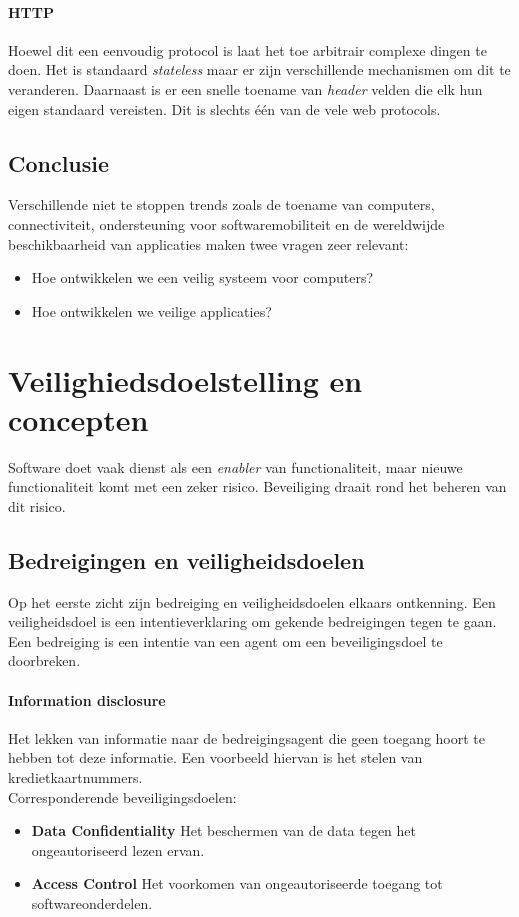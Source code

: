 \documentclass[../main.tex]{subfiles}
\begin{document}
\paragraph{HTTP} Hoewel dit een eenvoudig protocol is laat het toe arbitrair complexe dingen te doen. Het is standaard \textit{stateless} maar er zijn verschillende mechanismen om dit te veranderen. Daarnaast is er een snelle toename van \textit{header} velden die elk hun eigen standaard vereisten. Dit is slechts \'e\'en van de vele web protocols.

\subsection{Conclusie}
Verschillende niet te stoppen trends zoals de toename van computers, connectiviteit, ondersteuning voor softwaremobiliteit en de wereldwijde beschikbaarheid van applicaties maken twee vragen zeer relevant:
\begin{itemize}
	\item Hoe ontwikkelen we een veilig systeem voor computers?
	\item Hoe ontwikkelen we veilige applicaties?
\end{itemize}

\section{Veilighiedsdoelstelling en concepten}
Software doet vaak dienst als een \textit{enabler} van functionaliteit, maar nieuwe functionaliteit komt met een zeker risico. Beveiliging draait rond het beheren van dit risico.
\subsection{Bedreigingen en veiligheidsdoelen}
Op het eerste zicht zijn bedreiging en veiligheidsdoelen elkaars ontkenning. Een veiligheidsdoel is een intentieverklaring om gekende bedreigingen tegen te gaan. Een bedreiging is een intentie van een agent om een beveiligingsdoel te doorbreken.

\paragraph{Information disclosure} 
Het lekken van informatie naar de bedreigingsagent die geen toegang hoort te hebben tot deze informatie. Een voorbeeld hiervan is het stelen van kredietkaartnummers. 
\\
Corresponderende beveiligingsdoelen:
\begin{itemize}
	\item \textbf{Data Confidentiality} Het beschermen van de data tegen het ongeautoriseerd lezen ervan.
	\item \textbf{Access Control} Het voorkomen van ongeautoriseerde toegang tot softwareonderdelen.
\end{itemize}
\end{document}
